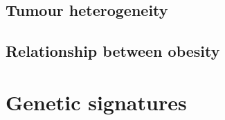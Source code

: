 


\subsection{Tumour heterogeneity}
\label{sub:tumour_heterogeneity}




\subsection{Relationship between obesity}
\label{subsec:obsbackground}



\section{Genetic signatures}
\label{sec:genetic_signatures}

